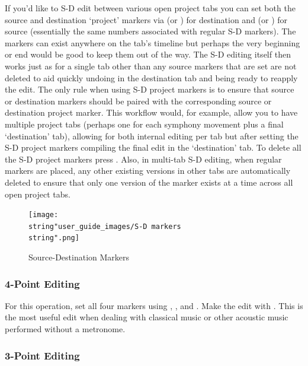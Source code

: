 \documentclass[10pt,american]{article}
\begin{document}
If you'd like to S-D edit between various open project tabs you can set both the
source and destination `project' markers via  (or
) for destination and  (or
) for source (essentially the same numbers associated with
regular S-D markers). The markers can exist anywhere on the tab's timeline but
perhaps the very beginning or end would be good to keep them out of the way. The
S-D editing itself then works just as for a single tab other than any source
markers that are set are not deleted to aid quickly undoing in the destination
tab and being ready to reapply the edit. The only rule when using S-D project
markers is to ensure that source or destination markers should be paired with
the corresponding source or destination project marker. This workflow would, for
example, allow you to have multiple project tabs (perhaps one for each symphony
movement plus a final `destination' tab), allowing for both internal editing per
tab but after setting the S-D project markers compiling the final edit in the
`destination' tab. To delete all the S-D project markers press
\keys{\shift+\del}. Also, in multi-tab S-D editing, when regular markers are
placed, any other existing versions in other tabs are automatically deleted to
ensure that only one version of the marker exists at a time across all open
project tabs.

\begin{figure}
\begin{centering}
\texttt{[image: \\string"user\_guide\_images/S-D markers\\string".png]}
\par\end{centering}
\caption{Source-Destination Markers}

\end{figure}


\subsubsection{4-Point Editing}

For this operation, set all four markers using  ,  , 
and  . Make the edit with  . This is the most useful edit when
dealing with classical music or other acoustic music performed without a
metronome.

\subsubsection{3-Point Editing}
\end{document}
